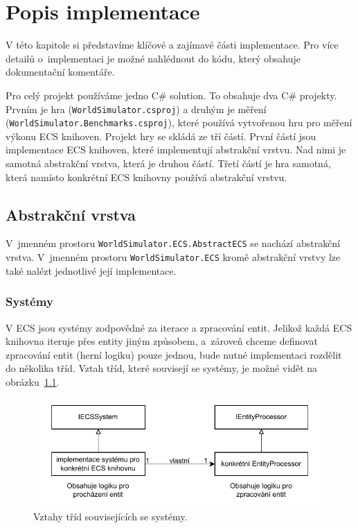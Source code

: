 \chapter{Popis implementace}
V této kapitole si představíme klíčové a zajímavé části implementace. Pro více detailů o~implementaci je možné nahlédnout do kódu, který obsahuje dokumentační komentáře.

Pro celý projekt používáme jedno C\# solution. To obsahuje dva C\# projekty. Prvním je hra (\texttt{WorldSimulator.csproj}) a druhým je měření \linebreak (\texttt{WorldSimulator.Benchmarks.csproj}), které používá vytvořenou hru pro měření výkonu ECS knihoven. Projekt hry se skládá ze tří částí. První částí jsou implementace ECS knihoven, které implementují abstrakční vrstvu. Nad nimi je samotná abstrakční vrstva, která je druhou částí. Třetí částí je hra samotná, která namísto konkrétní ECS knihovny používá abstrakční vrstvu.

\section{Abstrakční vrstva}
\label{sec:abstract-layer}
V~jmenném prostoru \texttt{WorldSimulator.ECS.AbstractECS} se nachází abstrakční vrstva. V~jmenném prostoru \texttt{WorldSimulator.ECS} kromě abstrakční vrstvy lze také nalézt jednotlivé její implementace.

\subsection{Systémy}
V ECS jsou systémy zodpovědné za iterace a zpracování entit. Jelikož každá ECS knihovna iteruje přes entity jiným způsobem, a~zároveň chceme definovat zpracování entit (herní logiku) pouze jednou, bude nutné implementaci rozdělit do několika tříd. Vztah tříd, které souvisejí se systémy, je možné vidět na obrázku~\ref{fig:abstract-layer-systems}.

\begin{figure}[!htb]
  \centering
  \includegraphics[width=0.8\linewidth]{img/abstract-layer-systems.pdf}
  \caption{Vztahy tříd souvisejících se systémy.}
  \label{fig:abstract-layer-systems}
\end{figure}

